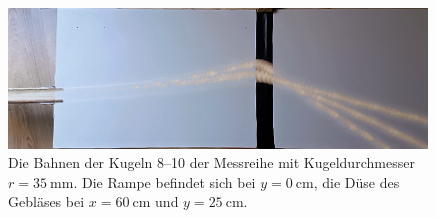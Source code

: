 \begin{figure}[htbp]
\vspace*{0.2cm}
\centering
 \includegraphics[width=0.99\textwidth]{images/aufbau2.png}
  \caption[Stroboskop-Effekt der Kugeln 8--10]{Die Bahnen der Kugeln 8--10 der Messreihe mit Kugeldurchmesser $r=\SI{35}{\milli\metre}$. Die Rampe befindet sich bei $y=\SI{0}{\centi\metre}$, die Düse des Gebläses bei $x=\SI{60}{\centi\metre}$ und $y=\SI{25}{\centi\metre}$.}
  \label{fig:aufbau2}
  \vspace{-0pt}
\end{figure}